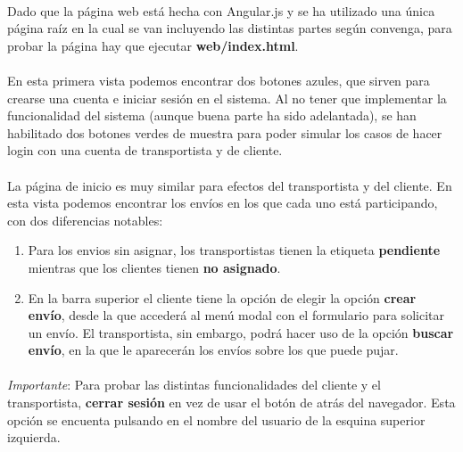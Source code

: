 \documentclass[10pt, a4paper,spanish]{article}
\begin{document}
		\paragraph{}
		Dado que la página web está hecha con Angular.js y se ha utilizado una única página raíz en la cual se van incluyendo las distintas partes según convenga, para probar la página hay que ejecutar \textbf{web/index.html}.

		\paragraph{}
		En esta primera vista podemos encontrar dos botones azules, que sirven para crearse una cuenta e iniciar sesión en el sistema. Al no tener que implementar la funcionalidad del sistema (aunque buena parte ha sido adelantada), se han habilitado dos botones verdes de muestra para poder simular los casos de hacer login con una cuenta de transportista y de cliente.

		\paragraph{}
		La página de inicio es muy similar para efectos del transportista y del cliente. En esta vista podemos encontrar los envíos en los que cada uno está participando, con dos diferencias notables:

		\begin{enumerate}
				\item Para los envios sin asignar, los transportistas tienen la etiqueta \textbf{pendiente} mientras que los clientes tienen \textbf{no asignado}.
				\item En la barra superior el cliente tiene la opción de elegir la opción \textbf{crear envío}, desde la que accederá al menú modal con el formulario para solicitar un envío. El transportista, sin embargo, podrá hacer uso de la opción \textbf{buscar envío}, en la que le aparecerán los envíos sobre los que puede pujar.
		\end{enumerate}

		\paragraph{}
		\textit{Importante}: Para probar las distintas funcionalidades del cliente y el transportista, \textbf{cerrar sesión} en vez de usar el botón de atrás del navegador. Esta opción se encuenta pulsando en el nombre del usuario de la esquina superior izquierda. 
\end{document}
